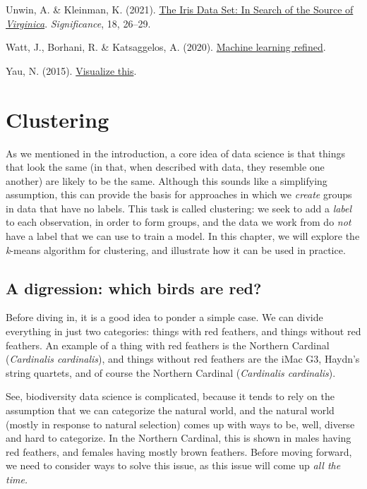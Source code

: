 \documentclass[
  letterpaper,
]{scrbook}
\newlength{\cslhangindent}
\newenvironment{CSLReferences}[2] %
 {\begin{list}{}{%
  \setlength{\itemindent}{0pt}
  \setlength{\leftmargin}{0pt}
  \setlength{\parsep}{0pt}
  \ifodd #1
   \setlength{\leftmargin}{\cslhangindent}
   \setlength{\itemindent}{-1\cslhangindent}
  \fi
  \setlength{\itemsep}{#2\baselineskip}}}
 {\end{list}}
\begin{document}
\begin{CSLReferences}{1}{0}
Unwin, A. \& Kleinman, K. (2021).
\href{https://doi.org/10.1111/1740-9713.01589}{The Iris Data Set: In
Search of the Source of {\emph{Virginica}}}. \emph{Significance}, 18,
26--29.

Watt, J., Borhani, R. \& Katsaggelos, A. (2020).
\href{https://doi.org/10.1017/9781108690935}{Machine learning refined}.

Yau, N. (2015). \href{https://doi.org/10.1002/9781118722213}{Visualize
this}.

\end{CSLReferences}


\chapter{Clustering}\label{sec-clustering}

As we mentioned in the introduction, a core idea of data science is that
things that look the same (in that, when described with data, they
resemble one another) are likely to be the same. Although this sounds
like a simplifying assumption, this can provide the basis for approaches
in which we \emph{create} groups in data that have no labels. This task
is called clustering: we seek to add a \emph{label} to each observation,
in order to form groups, and the data we work from do \emph{not} have a
label that we can use to train a model. In this chapter, we will explore
the \emph{k}-means algorithm for clustering, and illustrate how it can
be used in practice.

\section{A digression: which birds are
red?}\label{a-digression-which-birds-are-red}

Before diving in, it is a good idea to ponder a simple case. We can
divide everything in just two categories: things with red feathers, and
things without red feathers. An example of a thing with red feathers is
the Northern Cardinal (\emph{Cardinalis cardinalis}), and things without
red feathers are the iMac G3, Haydn's string quartets, and of course the
Northern Cardinal (\emph{Cardinalis cardinalis}).

See, biodiversity data science is complicated, because it tends to rely
on the assumption that we can categorize the natural world, and the
natural world (mostly in response to natural selection) comes up with
ways to be, well, diverse and hard to categorize. In the Northern
Cardinal, this is shown in males having red feathers, and females having
mostly brown feathers. Before moving forward, we need to consider ways
to solve this issue, as this issue will come up \emph{all the time.}
\end{document}
